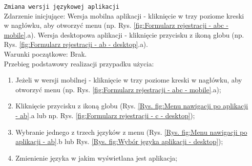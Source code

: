 \texttt{Zmiana wersji językowej aplikacji} \\
Zdarzenie inicjujące: Wersja mobilna aplikacji - kliknięcie w trzy poziome kreski w nagłówku, aby otworzyć menu (np. Rys. \ref{fig:Formularz rejestracji - abc - mobile}.a). Wersja desktopowa aplikacji - kliknięcie przycisku z ikoną globu (np. Rys. \ref{fig:Formularz rejestracji - ab - desktop}.a). \\
Warunki początkowe: Brak. \\
Przebieg podstawowy realizacji przypadku użycia:
\begin{enumerate}
    \item Jeżeli w wersji mobilnej - kliknięcie w trzy poziome kreski w nagłówku, aby otworzyć menu (np. Rys. \ref{fig:Formularz rejestracji - abc - mobile}.a);
    \item Kliknięcie przycisku z ikoną globu (Rys. \ref{Rys. fig:Menu nawigacji po aplikacji - ab}.a lub np. Rys. \ref{fig:Formularz rejestracji - c - desktop});
    \item Wybranie jednego z trzech języków z menu (Rys. \ref{Rys. fig:Menu nawigacji po aplikacji - ab}.b lub Rys. \ref{Rys. fig:Wybór języka aplikacji - desktop});
    \item Zmienienie języka w jakim wyświetlana jest aplikacja;
\end{enumerate}
